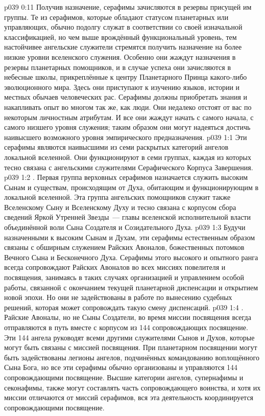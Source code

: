 \vs p039 0:11 Получив назначение, серафимы зачисляются в резервы присущей им группы. Те из серафимов, которые обладают статусом планетарных или управляющих, обычно подолгу служат в соответствии со своей изначальной классификацией, но чем выше врождённый функциональный уровень, тем настойчивее ангельские служители стремятся получить назначение на более низкие уровни вселенского служения. Особенно они жаждут назначения в резервы планетарных помощников, и в случае успеха они зачисляются в небесные школы, прикреплённые к центру Планетарного Принца какого\hyp{}либо эволюционного мира. Здесь они приступают к изучению языков, истории и местных обычаев человеческих рас. Серафимы должны приобретать знания и накапливать опыт во многом так же, как люди. Они недалеко отстоят от вас по некоторым личностным атрибутам. И все они жаждут начать с самого начала, с самого низшего уровня служения; таким образом они могут надеяться достичь наивысшего возможного уровня эмпирического предназначения.
\vs p039 1:1 Эти серафимы являются наивысшими из семи раскрытых категорий ангелов локальной вселенной. Они функционируют в семи группах, каждая из которых тесно связана с ангельскими служителями Серафического Корпуса Завершения.
\vs p039 1:2 . Первая группа верховных серафимов назначается служить высоким Сынам и существам, происходящим от Духа, обитающим и функционирующим в локальной вселенной. Эта группа ангельских помощников служит также Вселенскому Сыну и Вселенскому Духу и тесно связана с корпусом сбора сведений Яркой Утренней Звезды~--- главы вселенской исполнительной власти объединённой воли Сына Создателя и Созидательного Духа.
\vs p039 1:3 Будучи назначенными к высоким Сынам и Духам, эти серафимы естественным образом связаны с обширным служением Райских Авоналов, божественных потомков Вечного Сына и Бесконечного Духа. Серафимы этого высокого и опытного ранга всегда сопровождают Райских Авоналов во всех миссиях повелителя и посвящения, занимаясь в таких случаях организацией и управлением особой работы, связанной с окончанием текущей планетарной диспенсации и открытием новой эпохи. Но они не задействованы в работе по вынесению судебных решений, которая может сопровождать такую смену диспенсаций.
\vs p039 1:4 \pc {}. Райские Авоналы, но не Сыны Создатели, во время миссии посвящения всегда отправляются в путь вместе с корпусом из 144 сопровождающих посвящение. Эти 144 ангела руководят всеми другими служителями Сынов и Духов, которые могут быть связаны с миссией посвящения. При планетарном посвящении могут быть задействованы легионы ангелов, подчинённых командованию воплощённого Сына Бога, но все эти серафимы обычно организованы и управляются 144 сопровождающими посвящение. Высшие категории ангелов, супернафимы и секонафимы, также могут составлять часть сопровождающего воинства, и хотя их миссии отличаются от миссий серафимов, вся эта деятельность координируется сопровождающими посвящение.
